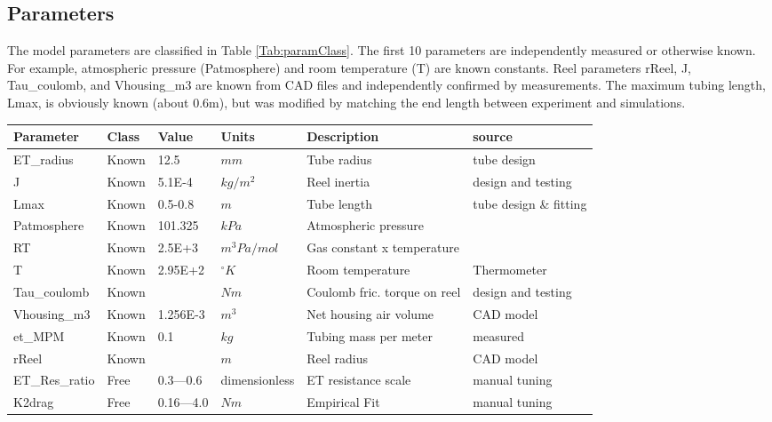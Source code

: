 \documentclass[letterpaper]{article}
\begin{document}
\subsection{Parameters}\label{Sec:Params}
The model parameters are classified in Table \ref{Tab:paramClass}.
The first 10 parameters are independently measured or otherwise known.  For example,
atmospheric pressure (Patmosphere) and room temperature (T) are known constants.
Reel parameters rReel, J, Tau\_coulomb, and Vhousing\_m3 are known from CAD files
and independently confirmed by measurements\cite{Lewis2024XX}.
The maximum tubing length, Lmax, is obviously known (about 0.6m), but was modified by matching the end length
between experiment and simulations.

\begin{table}
\begin{tabular}{l|l|l|l|l|l}
Parameter     &  Class     & Value   & Units     & Description      & source \\ \hline
ET\_radius     &  Known     & 12.5    &  $mm$       & Tube radius      & tube design \\
J             &  Known     & 5.1E-4 &  $kg/m^2$    & Reel inertia     & design and testing \cite{Lewis2024XX} \\
Lmax          &  Known     & 0.5-0.8 &  $m$        & Tube length      & tube design \& fitting \\
Patmosphere   &  Known     & 101.325 &  $kPa$      & Atmospheric pressure & \\
RT            &  Known     & 2.5E+3 &   $m^3 Pa/mol$   & Gas constant x temperature &  \\
T             &  Known     & 2.95E+2 &  $^\circ K$    & Room temperature   & Thermometer \\
Tau\_coulomb   &  Known     &        &  $Nm$       & Coulomb fric. torque on reel  & design and testing \cite{Lewis2024XX} \\
Vhousing\_m3   &  Known     &  1.256E-3 &  $m^3$      & Net housing air volume  & CAD model \\
et\_MPM        &  Known     &  0.1    &  $kg$       & Tubing mass per meter  & measured \\
rReel         &  Known     &         &   $m$       & Reel radius & CAD model \\ \hline
ET\_Res\_ratio  &  Free      & 0.3---0.6 &  dimensionless &  ET resistance scale & manual tuning \\
K2drag        &  Free      & 0.16---4.0  &  $Nm$       & Empirical Fit    & manual tuning \\

\end{tabular}
\end{table}
\end{document}
